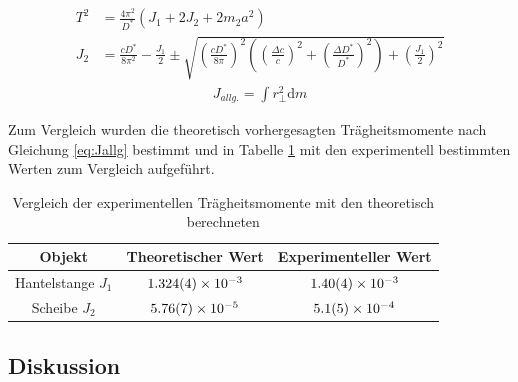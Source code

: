 \begin{align}
		T^2&= \frac{4 \pi^2}{D^*}(J_1+2J_2+2m_2 a^2)
	\label{eq:hantelta}\\
J_2&=\frac{c D^*}{8 \pi ^2}-\frac{J_1}{2} \pm \sqrt{\left( \frac{c D^*}{8 \pi}\right) ^2\left( \left( \frac{\Delta c}{c}\right) ^2+  \left( \frac{\Delta D^*}{D^*}\right) ^2\right) + \left(\frac{J_1}{2}\right)^2 }\label{eq:hantelJ2}
\end{align}
\begin{align}
	J_{allg.}=\int r_{\perp}^2 \textrm{d}m
	\label{eq:Jallg}
\end{align}

Zum Vergleich wurden die theoretisch vorhergesagten Trägheitsmomente nach Gleichung \ref{eq:Jallg} bestimmt und in Tabelle \ref{tab:vglJ} mit den experimentell bestimmten Werten zum Vergleich aufgeführt. 

\begin{table}[h!]
	\caption{Vergleich der experimentellen Trägheitsmomente mit den theoretisch berechneten}
	\begin{tabular}{|c|c|c|}
		\hline 
		Objekt &Theoretischer Wert	& Experimenteller Wert  \\ 
		\hline 
		Hantelstange $J_1$ &$\SI{1.324\pm 0.004 e-3}{}$	& $\SI{1.40\pm 0.04e-3}{}$ \\ 
		\hline 
		Scheibe $J_2$&  $\SI{5.76\pm 0.07e-5}{}$	&$\SI{5.1 \pm 0.5  e-04}{}$ \\ 
		\hline 
	\end{tabular} 
	\label{tab:vglJ}
\end{table}








\subsection{Diskussion}
\label{sec:disc:pendel}

